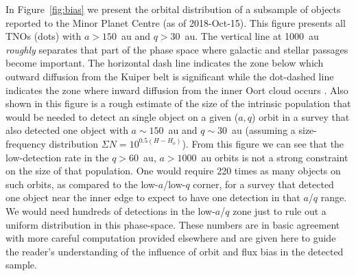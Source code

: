 \documentclass[preprint]{aastex62}
\begin{document}
In Figure~\ref{fig:bias} we present the orbital distribution of a subsample of objects reported to the Minor Planet Centre (as of 2018-Oct-15). This figure presents all TNOs (dots) with $a > 150$~au and $q > 30$~au.  The vertical line at 1000~au {\em roughly} separates that part of the phase space where galactic and stellar passages become important. The horizontal dash line indicates the zone below which outward diffusion from the Kuiper belt is significant while the dot-dashed line indicates the zone where inward diffusion from the inner Oort cloud occurs \citep[see Section~\ref{sec:diffusion} and][for details]{bannister17}.  Also shown in this figure is a rough estimate of the size of the intrinsic population that would be needed to detect an single object on a given ($a,q$) orbit in a survey that also detected one object with $a \sim 150$~au and $q \sim 30$~au (assuming a size-frequency distribution $ \Sigma{N} = 10^{0.5(H-H_o)}$).  From this figure we can see that the low-detection rate in the $q>60$~au, $a > 1000$~au orbits is not a strong constraint on the size of that population. One would require 220 times as many objects on such orbits, as compared to the low-$a$/low-$q$ corner, for a survey that detected one object near the inner edge to expect to have one detection in that $a$/$q$ range.  We would need hundreds of detections in the low-$a$/$q$ zone just to rule out a uniform distribution in this phase-space.  These numbers are in basic agreement with more careful computation provided elsewhere \citep[e.g.][]{sheppard18} and are given here to guide the reader's understanding of the influence of orbit and flux bias in the detected sample.
\end{document}
